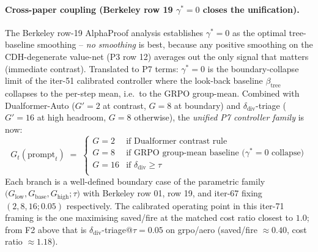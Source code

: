\paragraph{Cross-paper coupling (Berkeley row 19 $\gamma^*{=}0$ closes the unification).}
The Berkeley row-19 AlphaProof analysis \citep{alphaproof2025nature}
establishes $\gamma^*{=}0$ as the optimal tree-baseline smoothing --
\emph{no smoothing} is best, because any positive smoothing on the
CDH-degenerate value-net (P3 row 12) averages out the only signal
that matters (immediate contrast). Translated to P7 terms:
$\gamma^*{=}0$ is the boundary-collapse limit of the iter-51
calibrated controller where the look-back baseline $\beta_{\mathrm{tree}}$
collapses to the per-step mean, i.e.\ to the GRPO group-mean.
Combined with Dualformer-Auto ($G'{=}2$ at contrast, $G{=}8$ at
boundary) and $\delta_{\mathrm{div}}$-triage ($G'{=}16$ at high
headroom, $G{=}8$ otherwise), the \emph{unified P7 controller family}
is now:
\begin{equation*}
G_t(\mathrm{prompt}_t) \;=\; \begin{cases}
G{=}2  & \text{if Dualformer contrast rule} \\
G{=}8  & \text{if GRPO group-mean baseline ($\gamma^*{=}0$ collapse)} \\
G{=}16 & \text{if $\delta_{\mathrm{div}} \geq \tau$} \\
\end{cases}
\end{equation*}
Each branch is a well-defined boundary case of the parametric family
$\bigl(G_{\mathrm{low}}, G_{\mathrm{base}}, G_{\mathrm{high}}; \tau\bigr)$
with Berkeley row 01, row 19, and iter-67 fixing
$(2, 8, 16; 0.05)$ respectively. The calibrated operating point in
this iter-71 framing is the one maximising saved/fire at the matched
cost ratio closest to $1.0$; from F2 above that is
$\delta_{\mathrm{div}}$-triage@$\tau{=}0.05$ on grpo/aero
(saved/fire $\approx 0.40$, cost ratio $\approx 1.18$).


